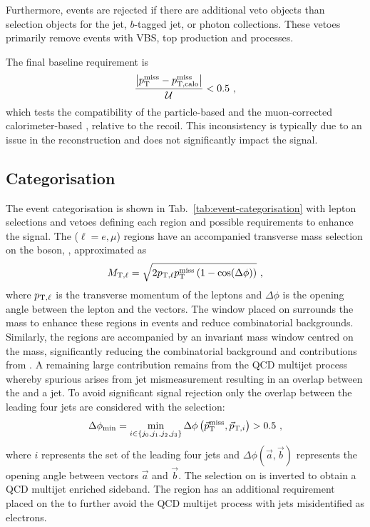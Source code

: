 Furthermore, events are rejected if there are additional veto objects than selection objects for the jet, $b$-tagged jet, or photon collections. These vetoes primarily remove events with VBS, top production and \Igj processes.

The final baseline requirement is
%
\begin{equation}
    \frac{\big| p_{\text{T}}^{\mathrm{miss}} - p_{\text{T,calo}}^{\mathrm{miss}} \big|}{\mathcal{U}} < 0.5\ ,
\end{equation}
%
which tests the compatibility of the particle-based \ptmiss and the muon-corrected calorimeter-based \ptmisscalo, relative to the recoil. This inconsistency is typically due to an issue in the reconstruction and does not significantly impact the signal.


\subsection{Categorisation}\label{sec:categorisation}

The event categorisation is shown in Tab.~\ref{tab:event-categorisation} with lepton selections and vetoes defining each region and possible requirements to enhance the signal. The \ellplusjets ($\ell=e,\mu$) regions have an accompanied transverse mass selection on the \PW boson, \mtell, approximated as
%
\begin{equation}
    \mtell = \sqrt{2 \mom_{\mathrm{T},\ell} \ptmiss \left( 1 - \cos(\Delta\phi)\right)}\ ,
\end{equation}
%
where $p_{\mathrm{T},\ell}$ is the transverse momentum of the leptons and $\Delta\phi$ is the opening angle between the lepton and the \vecptmiss vectors. The window placed on \mtell surrounds the \PW mass to enhance these regions in \IWj events and reduce combinatorial backgrounds. Similarly, the \diellplusjets regions are accompanied by an invariant mass \mellell window centred on the \PZ mass, significantly reducing the combinatorial background and contributions from \Igstarj. A remaining large contribution remains from the QCD multijet process whereby spurious \ptmiss arises from jet mismeasurement resulting in an overlap between the \ptmiss and a jet. To avoid significant signal rejection only the overlap between the leading four jets are considered with the selection:
%
\begin{equation}
    \mindphi = \min_{i\in\{j_0,j_1,j_2,j_3\}} \Delta\phi\left(\vecptmiss, \vec{\mom}_{\mathrm{T},i}\right) > 0.5\ ,
\end{equation}
%
where $i$ represents the set of the leading four jets and $\Delta\phi(\vec{a},\vec{b})$ represents the opening angle between vectors $\vec{a}$ and $\vec{b}$. The selection on \mindphi is inverted to obtain a QCD multijet enriched sideband. The \eleplusjets region has an additional requirement placed on the \ptmiss to further avoid the QCD multijet process with jets misidentified as electrons.

